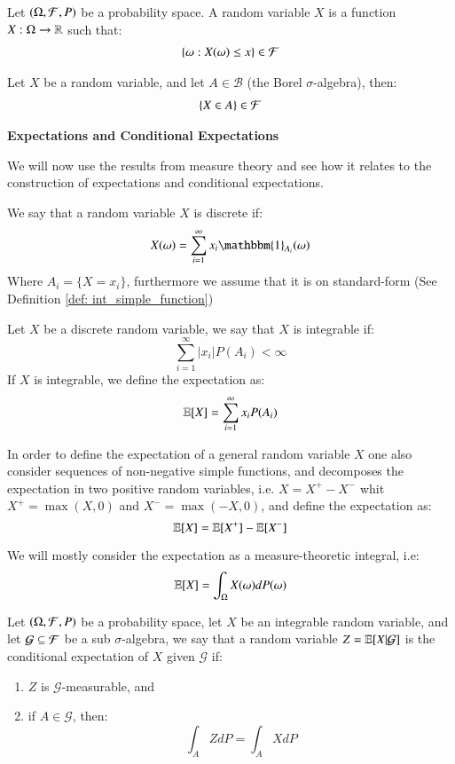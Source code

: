 \begin{definition}
Let $(\Omega, \mathcal{F}, P)$ be a probability space. A random variable $X$ is a function $X:\Omega \to \mathbb{R}$ such that: 
\begin{align*}
\{\omega: X(\omega) \leq x\} \in \mathcal{F}   
\end{align*}
\end{definition}

\begin{proposition}
Let $X$ be a random variable, and let $A \in \mathcal{B}$ (the Borel $\sigma$-algebra), then: 
\begin{align*}
\{X \in A\} \in \mathcal{F}    
\end{align*}
\end{proposition}

\centerline{\textbf{Expectations and Conditional Expectations}}
We will now use the results from measure theory and see how it relates to the construction of expectations and conditional expectations. 

\begin{definition}
We say that a random variable $X$ is discrete if: 
\[
X(\omega) = \sum_{i=1}^{\infty}x_{i}\mathbbm{1}_{A_{i}}(\omega)
\]
Where $A_{i} = \{X = x_{i}\}$, furthermore we assume that it is on standard-form (See Definition \ref{def: int_simple_function})
\end{definition}

\begin{definition}
Let $X$ be a discrete random variable, we say that $X$ is integrable if:
\[
\sum_{i=1}^{\infty}|x_{i}|P(A_{i}) < \infty
\]
If $X$ is integrable, we define the expectation as:
\[
\mathbb{E}[X] = \sum_{i=1}^{\infty}x_{i}P(A_{i})
\]
\end{definition}

In order to define the expectation of a general random variable $X$ one also consider sequences of non-negative simple functions, and decomposes the expectation in two positive random variables, i.e. $X = X^{+} - X^{-}$ whit $X^{+} = \max(X,0)$ and $X^{-} = \max(-X,0)$, and define the expectation as: 
\[
\mathbb{E}[X] = \mathbb{E}[X^{+}] - \mathbb{E}[X^{-}]
\]

We will mostly consider the expectation as a measure-theoretic integral, i.e: 
\[
\mathbb{E}[X] = \int_{\Omega}X(\omega)dP(\omega)
\]


\begin{definition}
Let $(\Omega, \mathcal{F}, P)$ be a probability space, let $X$ be an integrable random variable, and let $\mathcal{G} \subseteq \mathcal{F}$ be a sub $\sigma$-algebra, we say that a random variable $Z = \mathbb{E}[X|\mathcal{G}]$ is the conditional expectation of $X$ given $\mathcal{G}$ if: 
\begin{enumerate}[label= (\roman*), , leftmargin=*]
    \item $Z$ is $\mathcal{G}$-measurable, and
    \item if $A\in \mathcal{G}$, then:
    \[
    \int_{A}ZdP = \int_{A}XdP
    \]
\end{enumerate}
\end{definition}

